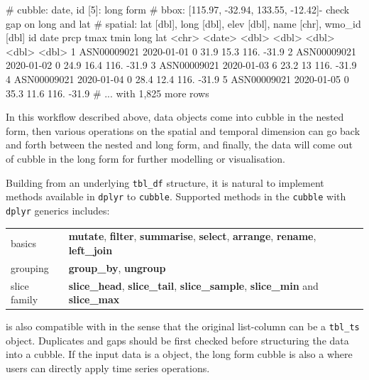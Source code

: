 \documentclass[
]{jss}
\begin{document}
\begin{CodeChunk}
\begin{CodeOutput}
# cubble:  date, id [5]: long form
# bbox:    [115.97, -32.94, 133.55, -12.42]- check gap on long and lat
# spatial: lat [dbl], long [dbl], elev [dbl], name [chr], wmo_id [dbl]
  id          date        prcp  tmax  tmin  long   lat
  <chr>       <date>     <dbl> <dbl> <dbl> <dbl> <dbl>
1 ASN00009021 2020-01-01     0  31.9  15.3  116. -31.9
2 ASN00009021 2020-01-02     0  24.9  16.4  116. -31.9
3 ASN00009021 2020-01-03     6  23.2  13    116. -31.9
4 ASN00009021 2020-01-04     0  28.4  12.4  116. -31.9
5 ASN00009021 2020-01-05     0  35.3  11.6  116. -31.9
# ... with 1,825 more rows
\end{CodeOutput}
\end{CodeChunk}

In this workflow described above, data objects come into cubble in the
nested form, then various operations on the spatial and temporal
dimension can go back and forth between the nested and long form, and
finally, the data will come out of cubble in the long form for further
modelling or visualisation.

Building from an underlying \texttt{tbl\_df} structure, it is natural to
implement methods available in \texttt{dplyr} to \texttt{cubble}.
Supported methods in the \texttt{cubble} with \texttt{dplyr} generics
includes:

\begin{center}
\begin{tabular}{ | m{5em} | m{15cm}| } 
basics & \textbf{mutate}, \textbf{filter}, \textbf{summarise}, \textbf{select}, \textbf{arrange}, \textbf{rename}, \textbf{left\_join} \\
grouping &  \textbf{group\_by}, \textbf{ungroup}\\
slice family & \textbf{slice\_head}, \textbf{slice\_tail}, \textbf{slice\_sample}, \textbf{slice\_min} and \textbf{slice\_max} \\
\end{tabular}
\end{center}

 is also compatible with  in the sense that the
original list-column can be a \texttt{tbl\_ts} object. Duplicates and
gaps should be first checked before structuring the data into a cubble.
If the input data is a  object, the long form cubble is
also a  where users can directly apply time series
operations.

\newpage
\end{document}
